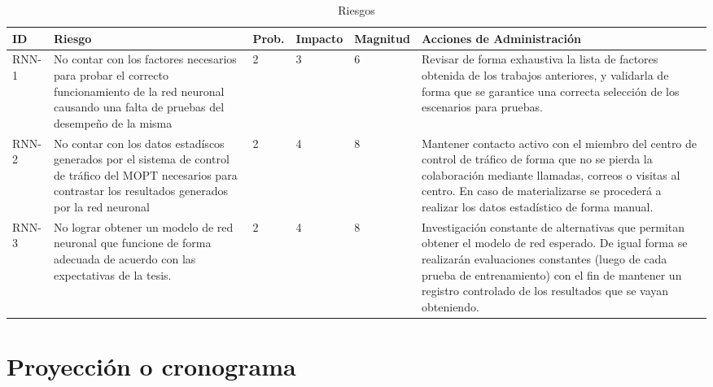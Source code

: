 	\begin{table}[!h]
			\centering
			\begin{tabular}{|p{1.3cm}|p{3cm}|p{1cm}|p{1.6cm}|p{1.8cm}|p{6cm}|}
				\hline
				\textbf{ID} & \textbf{Riesgo} & \textbf{Prob.} & \textbf{Impacto} & \textbf{Magnitud} & \textbf{Acciones de
				Administraci\'{o}n}\\ \hline 
				RNN-1 & No contar con los factores necesarios para probar el correcto
				funcionamiento de la red neuronal causando una falta de pruebas del
				desempe\~{n}o de la misma & 2 & 3 & 6 & Revisar de forma exhaustiva la lista
				de factores obtenida de los trabajos anteriores, y validarla de forma que se
				garantice una correcta selecci\'{o}n de los escenarios para pruebas.
				\\
				\hline
				RNN-2 & No contar con los datos estad\'{i}scos generados por el sistema de
				control de tr\'{a}fico del MOPT necesarios para contrastar los resultados
				generados por la red neuronal & 2 & 4 & 8 & Mantener contacto activo con
				el miembro del centro de control de tr\'{a}fico de forma que no se pierda
				la colaboraci\'{o}n mediante llamadas, correos o visitas al centro. En caso
				de materializarse se proceder\'{a} a realizar los datos estad\'{i}stico de
				forma manual.\\ 
				\hline 
				RNN-3 & No lograr obtener un modelo de red neuronal que funcione de forma
				adecuada de acuerdo con las expectativas de la tesis. & 2 & 4 & 8 &
				Investigaci\'{o}n constante de alternativas que permitan obtener el
				modelo de red esperado. De igual forma se realizar\'{a}n evaluaciones
				constantes (luego de cada prueba de entrenamiento) con el fin de mantener un
				registro controlado de los resultados que se vayan obteniendo. 
				\\ 
				\hline 							
				 
			\end{tabular}
			\caption{Riesgos}
			\label{tab:risk}
		\end{table}
		
	\section{Proyecci\'{o}n o cronograma}	